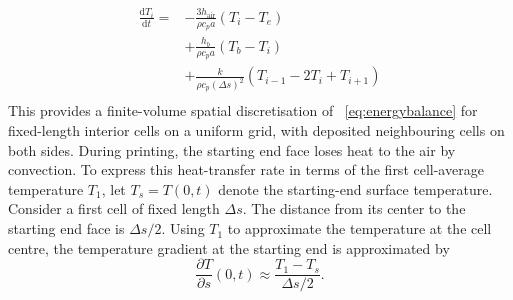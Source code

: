 \documentclass{article}
\begin{document}
\begin{equation}
    \begin{aligned}
        \frac{\mathrm{d}T_i}{\mathrm{d}t}
        ={}&-\frac{3h_{\mathrm{air}}}{\rho c_p a}(T_i-T_e)\\
           &+\frac{h_b}{\rho c_p a}(T_b-T_i)\\
           &+ \frac{k}{\rho c_p(\Delta s)^2}
           \left(T_{i-1}-2T_i+T_{i+1}\right)\\
    \end{aligned}
    \label{eq:interiorcell}
\end{equation}
This provides a finite-volume spatial discretisation of ~\eqref{eq:energybalance} for fixed-length interior cells on a uniform grid, with deposited neighbouring cells on both sides.
During printing, the starting end face loses heat to the air by convection. To express this heat-transfer rate in terms of the first cell-average temperature $T_1$, let $T_s=T(0,t)$ denote the starting-end surface temperature. Consider a first cell of fixed length $\Delta s$.
The distance from its center to the starting end face is $\Delta s/2$.
Using $T_1$ to approximate the temperature at the cell centre, the temperature gradient at the starting end is approximated by
\begin{equation}
    \frac{\partial T}{\partial s}(0,t)
    \approx \frac{T_1-T_s}{\Delta s/2}.
\end{equation}
\end{document}
